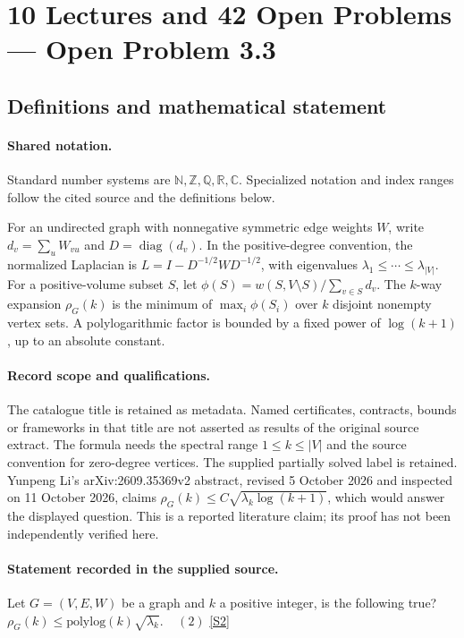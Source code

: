 \documentclass[11pt]{article}
\newcommand{\sref}[2]{\hyperlink{source:#1:#2}{[S#2]}}
\begin{document}
\section{10 Lectures and 42 Open Problems — Open Problem 3.3}\label{statement}

\subsection{Definitions and mathematical statement}

\paragraph{Shared notation.}Standard number systems are $\mathbb N,\mathbb Z,\mathbb Q,\mathbb R,\mathbb C$. Specialized notation and index ranges follow the cited source and the definitions below.


For an undirected graph with nonnegative symmetric edge weights $W$, write $d_v=\sum_uW_{vu}$ and $D=\operatorname{diag}(d_v)$. In the positive-degree convention, the normalized Laplacian is $L=I-D^{-1/2}WD^{-1/2}$, with eigenvalues $\lambda_1\leq\cdots\leq\lambda_{|V|}$. For a positive-volume subset $S$, let $\phi(S)=w(S,V\setminus S)/\sum_{v\in S}d_v$. The $k$-way expansion $\rho_G(k)$ is the minimum of $\max_i\phi(S_i)$ over $k$ disjoint nonempty vertex sets. A polylogarithmic factor is bounded by a fixed power of $\log(k+1)$, up to an absolute constant.
\paragraph{Record scope and qualifications.}
The catalogue title is retained as metadata. Named certificates, contracts, bounds or frameworks in that title are not asserted as results of the original source extract.
The formula needs the spectral range $1\leq k\leq|V|$ and the source convention for zero-degree vertices. The supplied partially solved label is retained. Yunpeng Li's arXiv:2609.35369v2 abstract, revised 5 October 2026 and inspected on 11 October 2026, claims $\rho_G(k)\leq C\sqrt{\lambda_k\log(k+1)}$, which would answer the displayed question. This is a reported literature claim; its proof has not been independently verified here.
\paragraph{Statement recorded in the supplied source.}
Let ${G=(V,E,W)}$ be a graph and ${k}$ a positive integer, is the following true? $\rho_G(k) \leq \mathrm{polylog}(k) \sqrt{\lambda_k}. \ \ \ \ \ (2)$ \sref{statement}{2}
\end{document}
